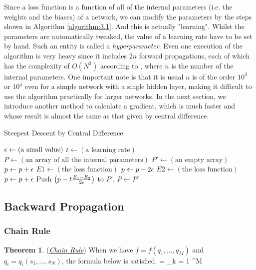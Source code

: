 \documentclass{article}
\theoremstyle{definition}
\newtheorem{__theorem}{Theorem}[section]
\newcommand{\theoremsymbol}{\hfill\square}
\newcommand{\alg}[1]{Algorithm \ref{algorithm:#1}}
\begin{document}
Since a loss function is a function of all of the internal parameters (i.e. the weights and the biases) of a network, we can modify the parameters by the steps shown in \alg{3.1}. And this is actually "learning". Whilst the parameters are automatically tweaked, the value of a learning rate have to be set by hand. Such an entity is called a {\it hyperparameter}. Even one execution of the algorithm is very heavy since it includes $2n$ forward propagations, each of which has the complexity of $O(N^3)$ according to , where $n$ is the number of the internal parameters. One important note is that it is usual $n$ is of the order $10^3$ or $10^4$ even for a simple network with a single hidden layer, making it difficult to use the algorithm practically for larger networks. In the next section, we introduce another method to calculate a gradient, which is much faster and whose result is almost the same as that given by central difference.

\begin{algorithm}
    \caption{Steepest Descent by Central Difference}
    \begin{algorithmic}
    \State $\epsilon \gets (\text{a small value})$
    \State $t \gets (\text{a learning rate})$
    \State $P \gets (\text{an array of all the internal parameters})$
    \State $P' \gets (\text{an empty array})$
    \State
        \State $p \gets p + \epsilon$
        \State $E1 \gets (\text{the loss function})$ 
        \State $p \gets p - 2\epsilon$
        \State $E2 \gets (\text{the loss function})$ 
        \State $p \gets p + \epsilon$
        \State Push $\left( p - t \frac{E_1 - E_2}{2 \epsilon} \right)$ to $P'$.
    \EndFor
    \State
    \State $P \gets P'$
    \end{algorithmic}
    \label{algorithm:3.1}
\end{algorithm}

\newpage

\subsection{Backward Propagation}

\subsubsection{Chain Rule}

\begin{__theorem}
(\href{https://en.wikipedia.org/wiki/Chain\_rule}{\it Chain Rule})
When we have $f = f(q_1, ..., q_M)$ and $q_i = q_i(s_1, ..., s_N)$, the formula below is satisfied.
\begineq
{} = \sum _{k = 1} ^M   
\edeq
\theoremsymbol
\label{theorem:3.1}
\end{__theorem}
\end{document}

